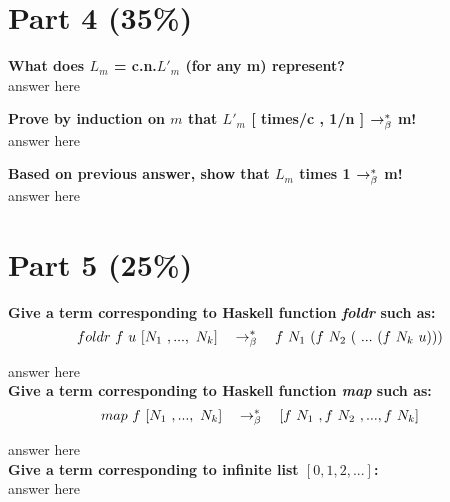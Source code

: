 \documentclass{article}
\begin{document}
	
	\section{Part 4 (35\%)}

	\begin{Large}
		\textbf{What does $L_m$ = \lamb c.\lamb n.$L'_m$ (for any m) represent?}\\
		
		answer here
		\newline
		
		\textbf{Prove by induction on $m$ that $L'_m$ [ times/c , 1/n ] $\rightarrow_\beta^*$  m!}\\
		
		answer here
		\newline
		
		\textbf{Based on previous answer, show that $L_m$ times 1  $\rightarrow_\beta^*$ m!}\\
		
		answer here
	\end{Large}
	\newpage
	
	
	
	\section{Part 5 (25\%)}
	
	\begin{Large}
		\textbf{Give a \lamb term corresponding to Haskell function \textit{foldr} such as:}\\
		
		\begin{equation*}
			foldr \ f \ u \ [N_1 \ ,..., \ N_k] \quad \rightarrow_\beta^*\quad f \ N_1\ (f \ N_2 \ ( \ ... \ (f \ N_k \ u)))
		\end{equation*}
		\newline
		
		answer here\\
		
		\textbf{Give a \lamb term corresponding to Haskell function \textit{map} such as:}\\
		
		\begin{equation*}
			map \ f \ [N_1\ ,..., \ N_k] \equalsT [f \ N_1 \ , f \ N_2 \ ,...,f \ N_k]
		\end{equation*}
		\newline
		
		answer here\\
		
		\textbf{Give a \lamb term corresponding to infinite list $[0,1,2,...]$:}\\
		
		answer here
	\end{Large}
\end{document}
